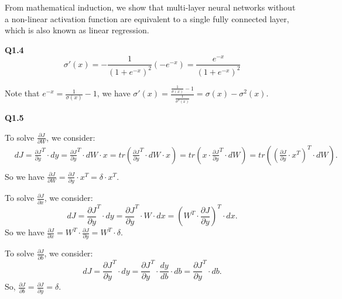 \documentclass[
  course = {{16-720B Computer Vision}},
  quartile = {{1}},
  assignment = 3-Neural\ Networks\ for\ Recognition,
  name = {{Kangle Deng}},
  email = {{kangled@andrew.cmu.edu}},
  firstexercise = 1
]{aga-homework}
\begin{document}
From mathematical induction, we show that multi-layer neural networks without a non-linear activation function are equivalent to a single fully connected layer, which is also known as linear regression.

\noindent \textbf{Q1.4}
\begin{equation*}
    \sigma'(x) = -\frac{1}{(1+e^{-x})^2}(-e^{-x}) = \frac{e^{-x}}{(1+e^{-x})^2}
\end{equation*}

Note that $e^{-x} = \frac{1}{\sigma(x)} - 1$, we have $\sigma'(x) = \frac{\frac{1}{\sigma(x)} - 1}{\frac{1}{\sigma^2(x)}} = \sigma(x) - \sigma^2(x)$.

\noindent \textbf{Q1.5}

To solve $\frac{\partial J}{\partial W}$, we consider:
\begin{equation*}
    \begin{aligned}
        & dJ = \frac{\partial J}{\partial y}^T \cdot dy = \frac{\partial J}{\partial y}^T \cdot dW \cdot x = tr(\frac{\partial J}{\partial y}^T \cdot dW \cdot x) = tr(x \cdot \frac{\partial J}{\partial y}^T \cdot dW) = tr((\frac{\partial J}{\partial y} \cdot x^T)^T \cdot dW). \\
    \end{aligned}
\end{equation*}
So we have $ \frac{\partial J}{\partial W} = \frac{\partial J}{\partial y} \cdot x^T = \delta \cdot x^T.$

To solve $\frac{\partial J}{\partial x}$, we consider:
\begin{equation*}
    dJ = \frac{\partial J}{\partial y}^T \cdot dy = \frac{\partial J}{\partial y}^T \cdot W \cdot dx = (W^T \cdot \frac{\partial J}{\partial y})^T \cdot dx.
\end{equation*}
So we have $\frac{\partial J}{\partial x} = W^T \cdot \frac{\partial J}{\partial y} = W^T \cdot \delta$.

To solve $\frac{\partial J}{\partial b}$, we consider:
\begin{equation*}
    dJ = \frac{\partial J}{\partial y}^T \cdot dy = \frac{\partial J}{\partial y}^T \cdot \frac{dy}{db} \cdot db = \frac{\partial J}{\partial y}^T \cdot db.
\end{equation*}
So, $\frac{\partial J}{\partial b} = \frac{\partial J}{\partial y} = \delta$.
\end{document}
